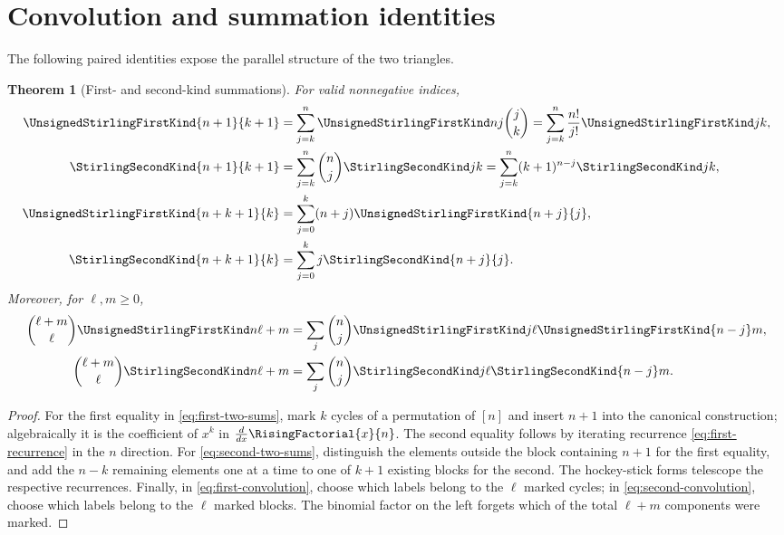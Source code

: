 \documentclass[11pt,a4paper,oneside,openany]{book}
\newtheorem{theorem}{Theorem}[chapter]
\theoremstyle{definition}
\theoremstyle{remark}
\begin{document}
\section{Convolution and summation identities}
The following paired identities expose the parallel structure of the two triangles.

\begin{theorem}[First- and second-kind summations]\label{thm:paired-sums}
For valid nonnegative indices,
\begin{align}
 \UnsignedStirlingFirstKind{n+1}{k+1}
   &=\sum_{j=k}^n\UnsignedStirlingFirstKind nj\binom jk
    =\sum_{j=k}^n\frac{n!}{j!}\UnsignedStirlingFirstKind jk,\label{eq:first-two-sums}\\
 \StirlingSecondKind{n+1}{k+1}
   &=\sum_{j=k}^n\binom nj\StirlingSecondKind jk
    =\sum_{j=k}^n(k+1)^{n-j}\StirlingSecondKind jk,\label{eq:second-two-sums}\\
 \UnsignedStirlingFirstKind{n+k+1}{k}
   &=\sum_{j=0}^k(n+j)\UnsignedStirlingFirstKind{n+j}{j},\label{eq:first-hockey}\\
 \StirlingSecondKind{n+k+1}{k}
   &=\sum_{j=0}^kj\StirlingSecondKind{n+j}{j}.\label{eq:second-hockey}
\end{align}
Moreover, for $\ell,m\ge0$,
\begin{align}
 \binom{\ell+m}{\ell}\UnsignedStirlingFirstKind n{\ell+m}
 &=\sum_j\binom nj\UnsignedStirlingFirstKind j\ell\UnsignedStirlingFirstKind{n-j}m,
 \label{eq:first-convolution}\\
 \binom{\ell+m}{\ell}\StirlingSecondKind n{\ell+m}
 &=\sum_j\binom nj\StirlingSecondKind j\ell\StirlingSecondKind{n-j}m.
 \label{eq:second-convolution}
\end{align}
\end{theorem}
\begin{proof}
For the first equality in \cref{eq:first-two-sums}, mark $k$ cycles of a permutation
of $[n]$ and insert $n+1$ into the canonical construction; algebraically it is the
coefficient of $x^k$ in $\frac{d}{dx}\RisingFactorial{x}{n}$.  The second equality follows by
iterating recurrence \cref{eq:first-recurrence} in the $n$ direction.  For
\cref{eq:second-two-sums}, distinguish the elements outside the block containing
$n+1$ for the first equality, and add the $n-k$ remaining elements one at a time to
one of $k+1$ existing blocks for the second.  The hockey-stick forms telescope the
respective recurrences.  Finally, in \cref{eq:first-convolution}, choose which labels
belong to the $\ell$ marked cycles; in \cref{eq:second-convolution}, choose which
labels belong to the $\ell$ marked blocks.  The binomial factor on the left forgets
which of the total $\ell+m$ components were marked.
\end{proof}
\end{document}
